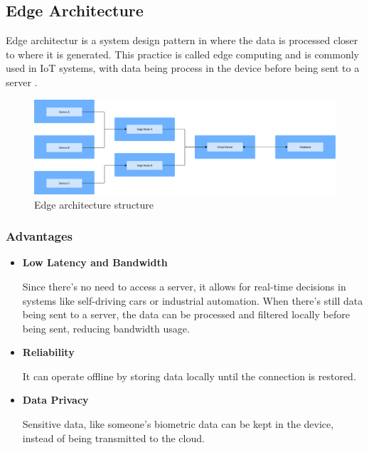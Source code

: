 \subsection{Edge Architecture}
Edge architectur is a system design pattern in where the data is processed
closer to where it is generated. This practice is called edge computing and
is commonly used in \gls{IoT} systems, with data being process in the device
before being sent to a server \cite{s20226441}.

\begin{figure}[H]
	\centering
	\includegraphics[width=\textwidth, height=0.5\textheight, keepaspectratio]{Chapters/Figures/Architectures/Edge.pdf}
	\caption{Edge architecture structure}
	\label{fig:architectures:edge}
\end{figure}

\subsubsection{Advantages}

\begin{itemize}


	\item \textbf{Low Latency and Bandwidth}

	      Since there's no need to access a server, it allows for real-time decisions
	      in systems like self-driving cars or industrial automation. When there's
	      still data being sent to a server, the data can be processed and filtered
	      locally before being sent, reducing bandwidth usage.


	\item \textbf{Reliability}

	      It can operate offline by storing data locally until the connection is
	      restored.

	\item \textbf{Data Privacy}

	      Sensitive data, like someone's biometric data can be kept in the device,
	      instead of being transmitted to the cloud.

\end{itemize}

